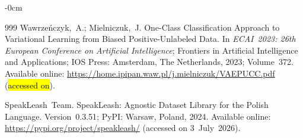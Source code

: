 \documentclass[applsci,article,accept,pdftex,moreauthors]{Definitions/mdpi}
\begin{document}
\begin{adjustwidth}{-\extralength}{0cm}
\begin{thebibliography}{999}
Wawrze\'{n}czyk,~A.; Mielniczuk,~J.
One-Class Classification Approach to Variational Learning from Biased
Positive-Unlabeled Data.
In \textit{ECAI~2023: 26th European Conference on Artificial Intelligence};
Frontiers in Artificial Intelligence and Applications;
IOS Press: Amsterdam, The Netherlands, 2023; Volume~372.
Available online: \url{https://home.ipipan.waw.pl/j.mielniczuk/VAEPUCC.pdf} (\hl{accessed on}). 

SpeakLeash~Team.
SpeakLeash: Agnostic Dataset Library for the Polish Language.
Version~0.3.51; PyPI: Warsaw, Poland, 2024.
Available online: \url{https://pypi.org/project/speakleash/}
(accessed on 3~July~2026).

\end{thebibliography} 

\PublishersNote{}
\end{adjustwidth}
\end{document}
